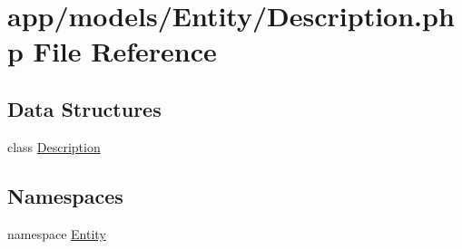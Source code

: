 \hypertarget{_description_8php}{\section{app/models/\-Entity/\-Description.php File Reference}
\label{_description_8php}
}
\subsection*{Data Structures}
\begin{DoxyCompactItemize}
\item 
class \hyperlink{class_entity_1_1_description}{Description}
\end{DoxyCompactItemize}
\subsection*{Namespaces}
\begin{DoxyCompactItemize}
\item 
namespace \hyperlink{namespace_entity}{Entity}
\end{DoxyCompactItemize}
